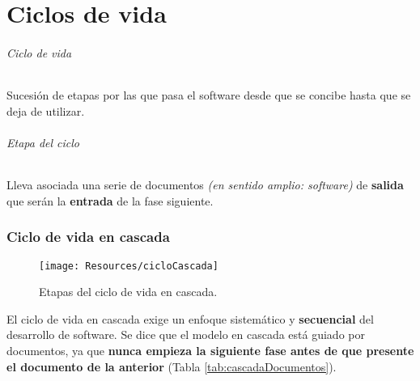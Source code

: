 \part{Ciclos de vida}
\paragraph{Ciclo de vida}  Sucesión de etapas por las que pasa el software desde que se concibe hasta que se deja de utilizar.
\paragraph{Etapa del ciclo} Lleva asociada una serie de documentos \textit{(en sentido amplio: software)} de \textbf{salida} que serán la \textbf{entrada} de la fase siguiente.
\section{Ciclo de vida en cascada}
\begin{figure}[H]
   \centering
   \texttt{[image: Resources/cicloCascada]}
   \caption{Etapas del ciclo de vida en cascada.}
   \label{fig:procesoCascada}
\end{figure}
El ciclo de vida en cascada exige un enfoque sistemático y \textbf{secuencial} del desarrollo de software. Se dice que el modelo en cascada está guiado por documentos, ya que \textbf{nunca empieza la siguiente fase antes de que presente el documento de la anterior} (Tabla \ref{tab:cascadaDocumentos}).\\

